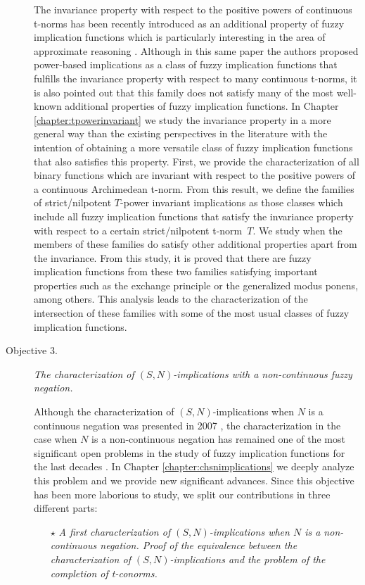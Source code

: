 \begin{description}
	The invariance property with respect to the positive powers of continuous t-norms has been recently introduced as an additional property of fuzzy implication functions which is particularly interesting in the area of approximate reasoning \cite{Massanet2017}. Although in this same paper the authors proposed power-based implications as a class of fuzzy implication functions that fulfills the invariance property with respect to many continuous t-norms, it is also pointed out that this family does not satisfy many of the most well-known additional properties of fuzzy implication functions. In Chapter \ref{chapter:tpowerinvariant} we study the invariance property in a more general way than the existing perspectives in the literature with the intention of obtaining a more versatile class of fuzzy implication functions that also satisfies this property. First, we provide the characterization of all binary functions which are invariant with respect to the positive powers of a continuous Archimedean t-norm. From this result, we define the families of strict/nilpotent $T$-power invariant implications as those classes which include all fuzzy implication functions that satisfy the invariance property with respect to a certain strict/nilpotent t-norm~$T$. We study when the members of these families do satisfy other additional properties apart from the invariance. From this study, it is proved that there are fuzzy implication functions from these two families satisfying important properties such as the exchange principle or the generalized modus ponens, among others. This analysis leads to the characterization of the intersection of these families with some of the most usual classes of fuzzy implication functions.    
	
	
	\item [Objective 3.] \textit{The characterization of $(S,N)$-implications with a non-continuous fuzzy negation.}
	
	Although the characterization of $(S,N)$-implications when $N$ is a continuous negation was presented in 2007 \cite{Baczynski2007}, the characterization in the case when $N$ is a non-continuous negation has remained one of the most significant open problems in the study of fuzzy implication functions for the last decades \cite{Baczynski2008,Baczynski2015}. In Chapter \ref{chapter:chsnimplications} we deeply analyze this problem and we provide new significant advances. Since this objective has been more laborious to study, we split our contributions in three different parts:
	\begin{itemize}
		\item[$\star$] \textit{A first characterization of $(S,N)$-implications when $N$ is a non-continuous negation. Proof of the equivalence between the characterization of $(S,N)$-implications and the problem of the completion of t-conorms.}
		

\end{itemize}
\end{description}
